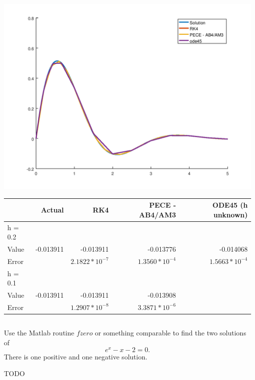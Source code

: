 \documentclass{jhwhw}
\begin{document}
\solution
    \begin{center}
	\includegraphics[scale=0.75]{p1_0_2}

	\begin{tabular}[pos]{|l|r|r|r|r|}
	    \hline
	    & Actual	& RK4			& PECE - AB4/AM3	& ODE45 (h unknown) \\ \hline
	    h = 0.2 &&&& \\ \hline
	    Value	& -0.013911	& -0.013911		& -0.013776  & -0.014068 \\ \hline
	    Error	& 		& $2.1822*10^{-7}$	& $1.3560*10^{-4}$ & $1.5663*10^{-4}$\\ \hline
	    h = 0.1 &&&& \\ \hline
	    Value	& -0.013911	& -0.013911		& -0.013908 & \\ \hline
	    Error	& 		& $1.2907*10^{-8}$	& $3.3871*10^{-6}$ & \\ \hline
	\end{tabular}
    \end{center}

    \inputminted[linenos,frame=lines,framesep=2mm]{octave}{p2.m}

\problem{}

    Use the Matlab routine $fzero$ or something comparable to find the two solutions of
    $$ e^x - x - 2 = 0.$$
    There is one positive and one negative solution.

\solution
    
    TODO
\end{document}
